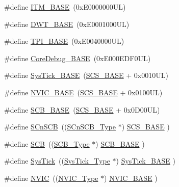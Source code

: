 \begin{DoxyCompactItemize}
\item 
\#define \hyperlink{group___c_m_s_i_s__core__base_gadd76251e412a195ec0a8f47227a8359e}{I\+T\+M\+\_\+\+B\+A\+SE}~(0x\+E0000000\+U\+L)
\item 
\#define \hyperlink{group___c_m_s_i_s__core__base_gafdab534f961bf8935eb456cb7700dcd2}{D\+W\+T\+\_\+\+B\+A\+SE}~(0x\+E0001000\+U\+L)
\item 
\#define \hyperlink{group___c_m_s_i_s__core__base_ga2b1eeff850a7e418844ca847145a1a68}{T\+P\+I\+\_\+\+B\+A\+SE}~(0x\+E0040000\+U\+L)
\item 
\#define \hyperlink{group___c_m_s_i_s__core__base_ga680604dbcda9e9b31a1639fcffe5230b}{Core\+Debug\+\_\+\+B\+A\+SE}~(0x\+E000\+E\+D\+F0\+U\+L)
\item 
\#define \hyperlink{group___c_m_s_i_s__core__base_ga58effaac0b93006b756d33209e814646}{Sys\+Tick\+\_\+\+B\+A\+SE}~(\hyperlink{group___c_m_s_i_s__core__base_ga3c14ed93192c8d9143322bbf77ebf770}{S\+C\+S\+\_\+\+B\+A\+SE} +  0x0010\+U\+L)
\item 
\#define \hyperlink{group___c_m_s_i_s__core__base_gaa0288691785a5f868238e0468b39523d}{N\+V\+I\+C\+\_\+\+B\+A\+SE}~(\hyperlink{group___c_m_s_i_s__core__base_ga3c14ed93192c8d9143322bbf77ebf770}{S\+C\+S\+\_\+\+B\+A\+SE} +  0x0100\+U\+L)
\item 
\#define \hyperlink{group___c_m_s_i_s__core__base_gad55a7ddb8d4b2398b0c1cfec76c0d9fd}{S\+C\+B\+\_\+\+B\+A\+SE}~(\hyperlink{group___c_m_s_i_s__core__base_ga3c14ed93192c8d9143322bbf77ebf770}{S\+C\+S\+\_\+\+B\+A\+SE} +  0x0\+D00\+U\+L)
\item 
\#define \hyperlink{group___c_m_s_i_s__core__base_ga9fe0cd2eef83a8adad94490d9ecca63f}{S\+Cn\+S\+CB}~((\hyperlink{struct_s_cn_s_c_b___type}{S\+Cn\+S\+C\+B\+\_\+\+Type}    $\ast$)     \hyperlink{group___c_m_s_i_s__core__base_ga3c14ed93192c8d9143322bbf77ebf770}{S\+C\+S\+\_\+\+B\+A\+SE}      )
\item 
\#define \hyperlink{group___c_m_s_i_s__core__base_gaaaf6477c2bde2f00f99e3c2fd1060b01}{S\+CB}~((\hyperlink{struct_s_c_b___type}{S\+C\+B\+\_\+\+Type}       $\ast$)     \hyperlink{group___c_m_s_i_s__core__base_gad55a7ddb8d4b2398b0c1cfec76c0d9fd}{S\+C\+B\+\_\+\+B\+A\+SE}      )
\item 
\#define \hyperlink{group___c_m_s_i_s__core__base_gacd96c53beeaff8f603fcda425eb295de}{Sys\+Tick}~((\hyperlink{struct_sys_tick___type}{Sys\+Tick\+\_\+\+Type}   $\ast$)     \hyperlink{group___c_m_s_i_s__core__base_ga58effaac0b93006b756d33209e814646}{Sys\+Tick\+\_\+\+B\+A\+SE}  )
\item 
\#define \hyperlink{group___c_m_s_i_s__core__base_gac8e97e8ce56ae9f57da1363a937f8a17}{N\+V\+IC}~((\hyperlink{struct_n_v_i_c___type}{N\+V\+I\+C\+\_\+\+Type}      $\ast$)     \hyperlink{group___c_m_s_i_s__core__base_gaa0288691785a5f868238e0468b39523d}{N\+V\+I\+C\+\_\+\+B\+A\+SE}     )

\end{DoxyCompactItemize}
